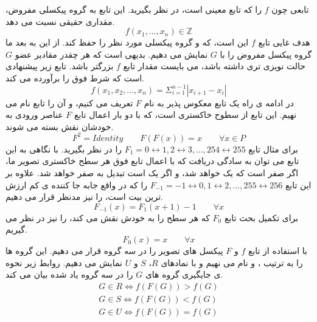تابعی چون $ f $ را که تابع معینی است، در نظر بگیرید. این تابع به گروه پیکسلی مفروض، مقداری حقیقی نسبت می دهد.
\begin{equation}
f(x_{1},\ldots ,x_{n})\in \mathbb{Z}
\end{equation}
هدف غایی تابع $ f $ این است، که {} و {} گروه پیکسلی مورد نظر را حفظ کند. از این به بعد ما گروه پیکسل مفروض را با $ G $ نمایش می دهیم. بدیهی است که هر چقدر مقادیر عضو $ G $ حالت نویزی تری داشته باشد، می بایست مقدار تابع $ f $ بزرگتر باشد. تابع زیر پیشنهادی است که شرط فوق را برآورده می کند. 
\begin{equation}
\label{fFun}
f(x_{1},x_{2},\ldots ,x_{n})=\Sigma _{i=1}^{n-1}|x_{i+1}-x_{i}|
\end{equation}
در ادامه ی راه یک تابع معکوس پذیر به نام $ F $ تعریف می کنیم، و آن را تابع { } نام می نهیم. این تابع  {} از سطوح خاکستری است، که با دو بار اعمال تابع $ F $ عناصر ورودی به خودشان نقش بسته می شوند. 
\begin{equation}
\label{FFun}
F^{2}=Identity\qquad F(F(x))=x\qquad \forall x\in P
\end{equation}
برای مثال تابع $ F_{1}=0\leftrightarrow 1,2\leftrightarrow 3,\ldots ,254\leftrightarrow 255 $ را در نظر بگیرید. با نگاهی به این تابع می توان به سادگی دریافت که با اعمال تابع فوق {} هر سطح خاکستری تصویر ما، اگر صفر است که یک خواهد شد، و اگر یک است تبدیل به صفر خواهد شد. علاوه بر این تابع $ F_{-1}=-1\leftrightarrow 0,1\leftrightarrow 2,\ldots ,255\leftrightarrow 256 $ را که در واقع جابه جا کننده ی کم ارزش ترین بیت است، را نیز مدنظر قرار می دهیم. 
\begin{equation}
\label{F-1}
F_{-1}(x)=F_{1}(x+1)-1 \qquad \forall x
\end{equation}
برای تکمیل بحث تابع $ F_{0} $ که هر سطح را به خودش نقش می کند، را نیز در نظر می گیریم. 
\begin{equation}
F_{0}(x)=x \qquad \forall x
\end{equation}
با استفاده از تابع $ f $ و $ F $ پیکسل های تصویر را در سه گروه قرار می دهیم. این گروه ها را به ترتیب
، 
 و {} نام می نهیم و با نمادهای $ R $، $ S $ و $ U $ نمایش می دهیم. روابط زیر نحوه ی جایگیری گروه های $ G $ را در سه گروه یاد شده بیان می کند.
\begin{eqnarray}
G\in R \Longleftrightarrow f(F(G))>f(G)\nonumber \\
G\in S \Longleftrightarrow f(F(G))<f(G)\nonumber \\
G\in U \Longleftrightarrow f(F(G))=f(G)
\end{eqnarray}
